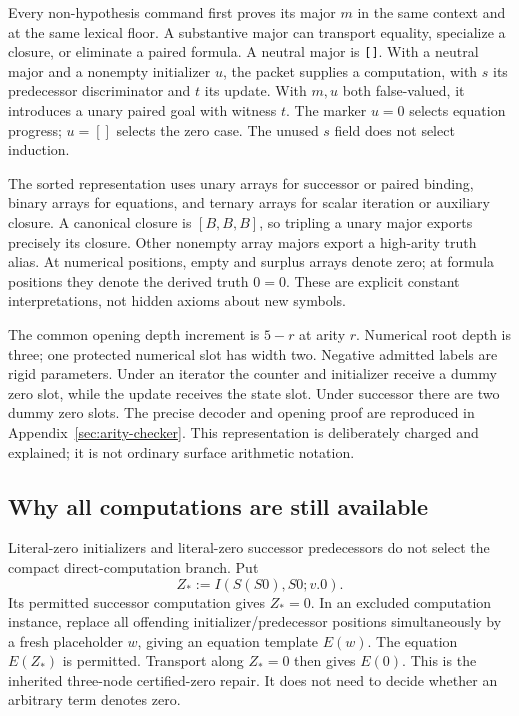 \documentclass[11pt,letterpaper]{article}
\theoremstyle{definition}\newtheorem{definition}[theorem]{Definition}
\theoremstyle{remark}\newtheorem{remark}[theorem]{Remark}
\begin{document}
Every non-hypothesis command first proves its major $m$ in the same context
and at the same lexical floor. A substantive major can transport equality,
specialize a closure, or eliminate a paired formula. A neutral major is
\texttt{[]}. With a neutral major and a nonempty initializer $u$, the
packet supplies a computation, with $s$ its predecessor discriminator and
$t$ its update. With $m,u$ both false-valued, it introduces a unary paired
goal with witness $t$. The marker $u=0$ selects equation progress; $u=[]$
selects the zero case. The unused $s$ field does not select induction.

The sorted representation uses unary arrays for successor or paired
binding, binary arrays for equations, and ternary arrays for scalar
iteration or auxiliary closure. A canonical closure is $[B,B,B]$, so
tripling a unary major exports precisely its closure. Other nonempty
array majors export a high-arity truth alias. At numerical positions,
empty and surplus arrays denote zero; at formula positions they denote
the derived truth $0=0$. These are explicit constant interpretations,
not hidden axioms about new symbols.

The common opening depth increment is $5-r$ at arity $r$. Numerical root
depth is three; one protected numerical slot has width two. Negative
admitted labels are rigid parameters. Under an iterator the counter and
initializer receive a dummy zero slot, while the update receives the
state slot. Under successor there are two dummy zero slots. The precise
decoder and opening proof are reproduced in
Appendix~\ref{sec:arity-checker}. This representation is deliberately
charged and explained; it is not ordinary surface arithmetic notation.

\subsection{Why all computations are still available}

Literal-zero initializers and literal-zero successor predecessors do not
select the compact direct-computation branch. Put
\[
                  Z_*:=I(S(S0),S0;v.0).
\]
Its permitted successor computation gives $Z_*=0$. In an excluded
computation instance, replace all offending initializer/predecessor positions
simultaneously by a fresh placeholder $w$, giving an equation template
$E(w)$. The equation $E(Z_*)$ is permitted. Transport along $Z_*=0$
then gives $E(0)$. This is the inherited three-node certified-zero repair.
It does not need to decide whether an arbitrary term denotes zero.
\end{document}
